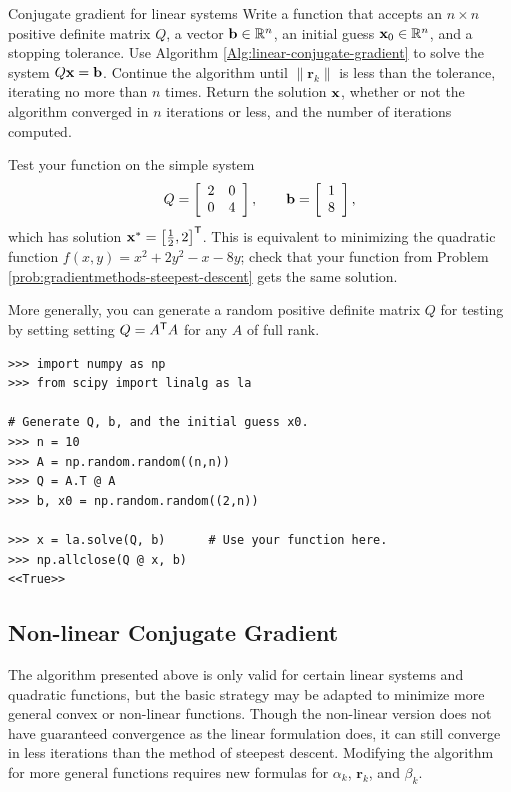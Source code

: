 \begin{problem}{Conjugate gradient for linear systems}{}
Write a function that accepts an $n \times n$ positive definite matrix $Q$, a vector $\mathbf{b}\in\mathbb{R}^n$, an initial guess $\mathbf{x}_0\in\mathbb{R}^n$, and a stopping tolerance.
Use Algorithm \ref{Alg:linear-conjugate-gradient} to solve the system $Q\mathbf{x} = \mathbf{b}$.
Continue the algorithm until $\|\mathbf{r}_k\|$ is less than the tolerance, iterating no more than $n$ times.
Return the solution $\mathbf{x}$, whether or not the algorithm converged in $n$ iterations or less, and the number of iterations computed.

Test your function on the simple system
\[
Q = \left[\begin{array}{cc}2 & 0 \\ 0 & 4\end{array}\right],
\qquad
\mathbf{b} = \left[\begin{array}{c}1 \\ 8\end{array}\right],
\]
which has solution $\mathbf{x}^* = \left[\frac{1}{2}, 2\right]^{\mathsf T}$.
This is equivalent to minimizing the quadratic function $f(x,y) = x^2 + 2y^2 - x - 8y$; check that your function from Problem \ref{prob:gradientmethods-steepest-descent} gets the same solution.

More generally, you can generate a random positive definite matrix $Q$ for testing by setting setting $Q = A^{\mathsf T} A$ for any $A$ of full rank.
\begin{lstlisting}
>>> import numpy as np
>>> from scipy import linalg as la

# Generate Q, b, and the initial guess x0.
>>> n = 10
>>> A = np.random.random((n,n))
>>> Q = A.T @ A
>>> b, x0 = np.random.random((2,n))

>>> x = la.solve(Q, b)      # Use your function here.
>>> np.allclose(Q @ x, b)
<<True>>
\end{lstlisting}
\label{prob:gradientmethods-linear-cg}
\end{problem}

\subsection{Non-linear Conjugate Gradient}
The algorithm presented above is only valid for certain linear systems and quadratic functions, but the basic strategy may be adapted to minimize more general convex or non-linear functions.
Though the non-linear version does not have guaranteed convergence as the linear formulation does, it can still converge in less iterations than the method of steepest descent.
Modifying the algorithm for more general functions requires new formulas for $\alpha_k$, $\mathbf{r}_k$, and $\beta_k$.

